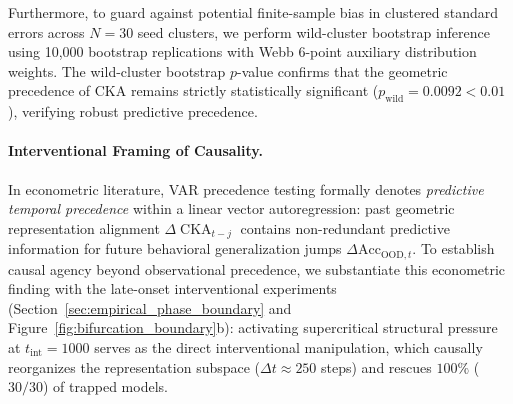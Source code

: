 \documentclass{article}
\theoremstyle{plain}
\theoremstyle{definition}
\DeclareMathOperator{\CKA}{CKA}
\begin{document}
Furthermore, to guard against potential finite-sample bias in clustered standard errors across $N=30$ seed clusters, we perform wild-cluster bootstrap inference \citep{Cameron2008Bootstrap} using 10,000 bootstrap replications with Webb 6-point auxiliary distribution weights. The wild-cluster bootstrap $p$-value confirms that the geometric precedence of CKA remains strictly statistically significant ($p_{\text{wild}} = 0.0092 < 0.01$), verifying robust predictive precedence.

\paragraph{Interventional Framing of Causality.}
In econometric literature, VAR precedence testing formally denotes \emph{predictive temporal precedence} within a linear vector autoregression: past geometric representation alignment $\Delta \CKA_{t-j}$ contains non-redundant predictive information for future behavioral generalization jumps $\Delta \text{Acc}_{\text{OOD}, t}$. To establish causal agency beyond observational precedence, we substantiate this econometric finding with the late-onset interventional experiments (Section~\ref{sec:empirical_phase_boundary} and Figure~\ref{fig:bifurcation_boundary}b): activating supercritical structural pressure at $t_{\text{int}} = 1000$ serves as the direct interventional manipulation, which causally reorganizes the representation subspace ($\Delta t \approx 250$ steps) and rescues $100\%$ ($30/30$) of trapped models.
\end{document}
